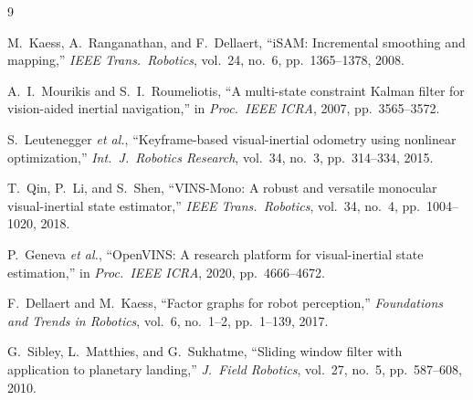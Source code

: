 \documentclass[11pt,a4paper]{article}
\theoremstyle{definition}
\theoremstyle{plain}
\begin{document}
\begin{thebibliography}{9}

  M.~Kaess, A.~Ranganathan, and F.~Dellaert,
  ``iSAM: Incremental smoothing and mapping,''
  \emph{IEEE Trans.\ Robotics}, vol.~24, no.~6, pp.~1365--1378, 2008.

  A.~I.~Mourikis and S.~I.~Roumeliotis,
  ``A multi-state constraint Kalman filter for vision-aided inertial navigation,''
  in \emph{Proc.\ IEEE ICRA}, 2007, pp.~3565--3572.

  S.~Leutenegger \emph{et al.},
  ``Keyframe-based visual-inertial odometry using nonlinear optimization,''
  \emph{Int.\ J.\ Robotics Research}, vol.~34, no.~3, pp.~314--334, 2015.

  T.~Qin, P.~Li, and S.~Shen,
  ``VINS-Mono: A robust and versatile monocular visual-inertial state estimator,''
  \emph{IEEE Trans.\ Robotics}, vol.~34, no.~4, pp.~1004--1020, 2018.

  P.~Geneva \emph{et al.},
  ``OpenVINS: A research platform for visual-inertial state estimation,''
  in \emph{Proc.\ IEEE ICRA}, 2020, pp.~4666--4672.

  F.~Dellaert and M.~Kaess,
  ``Factor graphs for robot perception,''
  \emph{Foundations and Trends in Robotics}, vol.~6, no.~1--2, pp.~1--139, 2017.

  G.~Sibley, L.~Matthies, and G.~Sukhatme,
  ``Sliding window filter with application to planetary landing,''
  \emph{J.\ Field Robotics}, vol.~27, no.~5, pp.~587--608, 2010.

\end{thebibliography}
\end{document}
